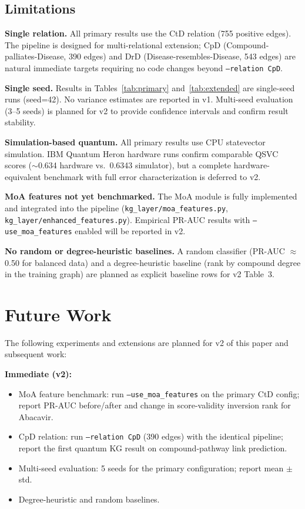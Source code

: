 \documentclass[twocolumn,10pt]{article}
\begin{document}
\subsection{Limitations}

\textbf{Single relation.} All primary results use the CtD relation (755 positive edges). The pipeline is designed for multi-relational extension; CpD (Compound-palliates-Disease, 390 edges) and DrD (Disease-resembles-Disease, 543 edges) are natural immediate targets requiring no code changes beyond \texttt{--relation CpD}.

\textbf{Single seed.} Results in Tables~\ref{tab:primary} and~\ref{tab:extended} are single-seed runs (seed=42). No variance estimates are reported in v1. Multi-seed evaluation (3--5 seeds) is planned for v2 to provide confidence intervals and confirm result stability.

\textbf{Simulation-based quantum.} All primary results use CPU statevector simulation. IBM Quantum Heron hardware runs confirm comparable QSVC scores (${\sim}$0.634 hardware vs.\ 0.6343 simulator), but a complete hardware-equivalent benchmark with full error characterization is deferred to v2.

\textbf{MoA features not yet benchmarked.} The MoA module is fully implemented and integrated into the pipeline (\texttt{kg\_layer/moa\_features.py}, \texttt{kg\_layer/enhanced\_features.py}). Empirical PR-AUC results with \texttt{--use\_moa\_features} enabled will be reported in v2.

\textbf{No random or degree-heuristic baselines.} A random classifier (PR-AUC $\approx$ 0.50 for balanced data) and a degree-heuristic baseline (rank by compound degree in the training graph) are planned as explicit baseline rows for v2 Table~3.

\section{Future Work}

The following experiments and extensions are planned for v2 of this paper and subsequent work:

\textbf{Immediate (v2):}
\begin{itemize}[leftmargin=*]
\item MoA feature benchmark: run \texttt{--use\_moa\_features} on the primary CtD config; report PR-AUC before/after and change in score-validity inversion rank for Abacavir.
\item CpD relation: run \texttt{--relation CpD} (390 edges) with the identical pipeline; report the first quantum KG result on compound-pathway link prediction.
\item Multi-seed evaluation: 5 seeds for the primary configuration; report mean $\pm$ std.
\item Degree-heuristic and random baselines.
\end{itemize}
\end{document}
